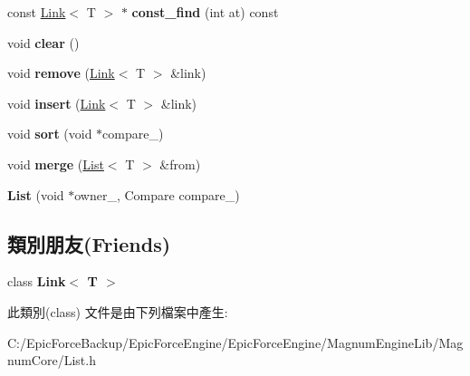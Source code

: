 \begin{DoxyCompactItemize}
\item 
const \hyperlink{class_magnum_1_1_link}{Link}$<$ T $>$ $\ast$ {\bfseries const\+\_\+find} (int at) const \hypertarget{class_magnum_1_1_list_a1ed9fb6d8d369a14223598e20e6b3c0a}{}\label{class_magnum_1_1_list_a1ed9fb6d8d369a14223598e20e6b3c0a}

\item 
void {\bfseries clear} ()\hypertarget{class_magnum_1_1_list_a77b7ca6d5b474adf4c00bf15161e7244}{}\label{class_magnum_1_1_list_a77b7ca6d5b474adf4c00bf15161e7244}

\item 
void {\bfseries remove} (\hyperlink{class_magnum_1_1_link}{Link}$<$ T $>$ \&link)\hypertarget{class_magnum_1_1_list_ad4b2185c7a0b0f4441c064a158aacbb8}{}\label{class_magnum_1_1_list_ad4b2185c7a0b0f4441c064a158aacbb8}

\item 
void {\bfseries insert} (\hyperlink{class_magnum_1_1_link}{Link}$<$ T $>$ \&link)\hypertarget{class_magnum_1_1_list_a38c74230a5f90351c004de38b24af519}{}\label{class_magnum_1_1_list_a38c74230a5f90351c004de38b24af519}

\item 
void {\bfseries sort} (void $\ast$compare\+\_\+)\hypertarget{class_magnum_1_1_list_a892787fb87c5e536e918b535d2b9f4d1}{}\label{class_magnum_1_1_list_a892787fb87c5e536e918b535d2b9f4d1}

\item 
void {\bfseries merge} (\hyperlink{class_magnum_1_1_list}{List}$<$ T $>$ \&from)\hypertarget{class_magnum_1_1_list_afc9e5d2dc320443430f544c6f3c532ae}{}\label{class_magnum_1_1_list_afc9e5d2dc320443430f544c6f3c532ae}

\item 
{\bfseries List} (void $\ast$owner\+\_, Compare compare\+\_)\hypertarget{class_magnum_1_1_list_a82ed319a70f21f0180b1a41bff8f6797}{}\label{class_magnum_1_1_list_a82ed319a70f21f0180b1a41bff8f6797}

\end{DoxyCompactItemize}
\subsection*{類別朋友(Friends)}
\begin{DoxyCompactItemize}
\item 
class {\bfseries Link$<$ T $>$}\hypertarget{class_magnum_1_1_list_a434e04a08281382d566369fea09f04f8}{}\label{class_magnum_1_1_list_a434e04a08281382d566369fea09f04f8}

\end{DoxyCompactItemize}


此類別(class) 文件是由下列檔案中產生\+:\begin{DoxyCompactItemize}
\item 
C\+:/\+Epic\+Force\+Backup/\+Epic\+Force\+Engine/\+Epic\+Force\+Engine/\+Magnum\+Engine\+Lib/\+Magnum\+Core/List.\+h\end{DoxyCompactItemize}
